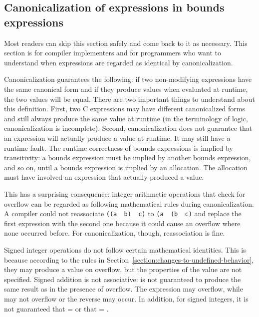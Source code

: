 \subsection{Canonicalization of expressions in bounds expressions}
\label{section:canonicalization}

Most readers can skip this section safely and come back to it as
necessary. This section is for compiler implementers and for programmers
who want to understand when expressions are regarded as identical by
canonicalization.

Canonicalization guarantees the following: if two non-modifying
expressions have the same canonical form and if they produce values when
evaluated at runtime, the two values will be equal. There are two
important things to understand about this definition. First, two C
expressions may have different canonicalized forms and still always
produce the same value at runtime (in the terminology of logic,
canonicalization is incomplete). Second, canonicalization does not
guarantee that an expression will actually produce a value at runtime.
It may still have a runtime fault. The runtime correctness of bounds
expressions is implied by transitivity: a bounds expression must be
implied by another bounds expression, and so on, until a bounds
expression is implied by an allocation. The allocation must have
involved an expression that actually produced a value.

This has a surprising consequence: integer arithmetic operations that
check for overflow can be regarded as following mathematical rules
during canonicalization. A compiler could not reassociate \texttt{((a
\plusovf\ b) \plusovf\ c)} to \texttt{(a
\plusovf\ (b \plusovf\ c)} and replace the first
expression with the second one because it could cause an overflow where
none occurred before. For canonicalization, though, reassociation is
fine.

Signed integer operations do not follow certain mathematical identities.
This is because according to the rules in 
Section~\ref{section:changes-to-undefined-behavior}, they may produce
a value on overflow, but the properties of the value are not specified.
Signed addition is not associative:  is not
guaranteed to produce the same result as  in the
presence of overflow. The expression  may overflow, while
 may not overflow or the reverse may occur. In addition,
for signed integers, it is not guaranteed that  =
 or that  = .


